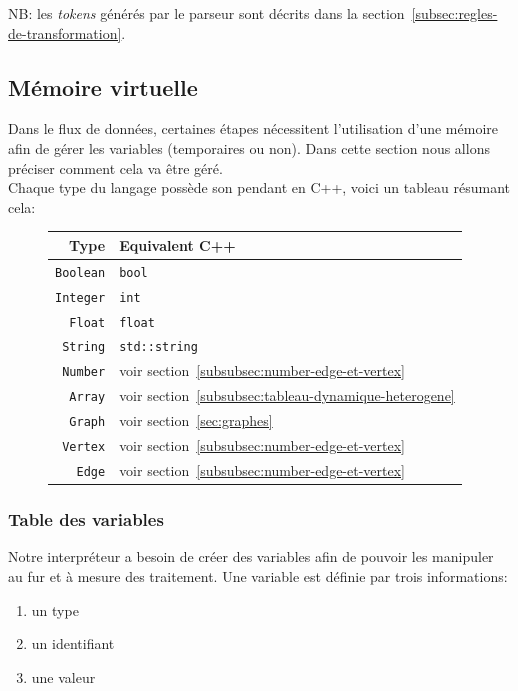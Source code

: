 \documentclass[french]{article}
\begin{document}
			NB: les \textit{tokens} générés par le parseur sont décrits dans la section~\ref{subsec:regles-de-transformation}.
		
		\subsection{Mémoire virtuelle} 
			\label{subsec:memoire-virtuelle}
			Dans le flux de données, certaines étapes nécessitent l'utilisation d'une mémoire afin de gérer les variables (temporaires ou non). Dans cette section nous allons préciser comment cela va être géré.\\
			
			Chaque type du langage possède son pendant en C++, voici un tableau résumant cela:\\
			
			\begin{figure}[H]
				\centering
				\begin{tabular}{r|l}
					Type & Equivalent C++\\ \hline\hline
					\texttt{Boolean} & \texttt{bool}\\
					\texttt{Integer} & \texttt{int}\\
					\texttt{Float} & \texttt{float}\\
					\texttt{String} & \texttt{std::string}\\
					\texttt{Number} & voir section~\ref{subsubsec:number-edge-et-vertex}\\
					\texttt{Array} & voir section~\ref{subsubsec:tableau-dynamique-heterogene}\\
					\texttt{Graph} & voir section~\ref{sec:graphes}\\
					\texttt{Vertex} & voir section~\ref{subsubsec:number-edge-et-vertex}\\
					\texttt{Edge} & voir section~\ref{subsubsec:number-edge-et-vertex}
				\end{tabular}
			\end{figure}
			
			\subsubsection{Table des variables}
				\label{subsubsec:table-des-variables}
				Notre interpréteur a besoin de créer des variables afin de pouvoir les manipuler au fur et à mesure des traitement. Une variable est définie par trois informations:
				
				\begin{enumerate}
					\item un type
					\item un identifiant
					\item une valeur
				\end{enumerate}
				
\end{document}

